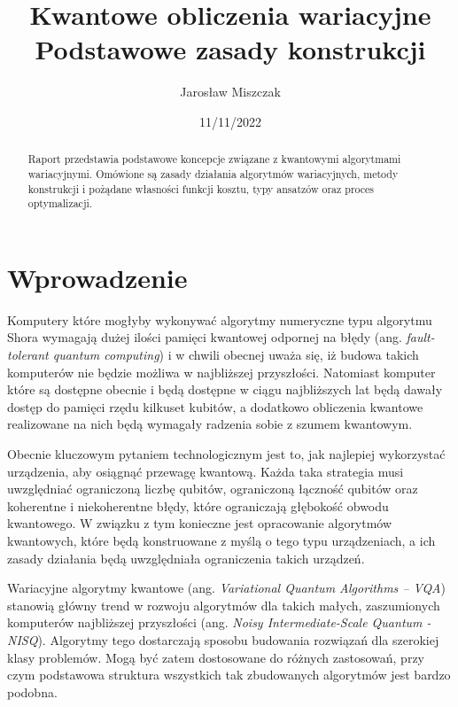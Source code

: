 \documentclass[a4paper,11pt]{article}
\newcommand{\ang}[1]{(ang. \emph{#1})}
\begin{document}
\title{Kwantowe obliczenia wariacyjne\\ {\normalsize Podstawowe zasady konstrukcji}}

\author{Jarosław Miszczak}
\date{11/11/2022}

\maketitle

\begin{abstract}
Raport przedstawia podstawowe koncepcje związane z kwantowymi algorytmami wariacyjnymi. Omówione są zasady działania algorytmów wariacyjnych, metody konstrukcji i pożądane własności funkcji kosztu, typy ansatzów oraz proces optymalizacji.
\end{abstract}


\hypertarget{wprowadzenie}{%
\section{Wprowadzenie}\label{wprowadzenie}}

Komputery które mogłyby wykonywać algorytmy numeryczne typu algorytmu Shora wymagają dużej ilości pamięci kwantowej odpornej na błędy \ang{fault-tolerant quantum computing} i w chwili obecnej uważa się, iż budowa takich komputerów nie będzie możliwa w najbliższej przyszłości. Natomiast komputer które są dostępne obecnie i będą dostępne w ciągu najbliższych lat będą dawały dostęp do pamięci rzędu kilkuset kubitów, a dodatkowo obliczenia kwantowe realizowane na nich będą wymagały radzenia sobie z szumem kwantowym. 
 
Obecnie kluczowym pytaniem technologicznym jest to, jak najlepiej wykorzystać  urządzenia, aby osiągnąć przewagę kwantową. Każda taka strategia musi uwzględniać ograniczoną liczbę qubitów, ograniczoną łączność qubitów oraz koherentne i niekoherentne błędy, które ograniczają głębokość obwodu kwantowego. W związku z tym konieczne jest opracowanie algorytmów kwantowych, które będą konstruowane z myślą o tego typu urządzeniach, a ich zasady działania będą uwzględniała ograniczenia takich urządzeń.
 
Wariacyjne algorytmy kwantowe \ang{Variational Quantum Algorithms -- VQA} stanowią główny trend w rozwoju algorytmów dla takich małych, zaszumionych komputerów najbliższej przyszłości \ang{Noisy Intermediate-Scale Quantum - NISQ}. Algorytmy tego dostarczają sposobu budowania rozwiązań dla szerokiej klasy problemów. Mogą być zatem dostosowane do różnych zastosowań, przy czym podstawowa struktura wszystkich tak zbudowanych algorytmów jest bardzo podobna.
\end{document}
